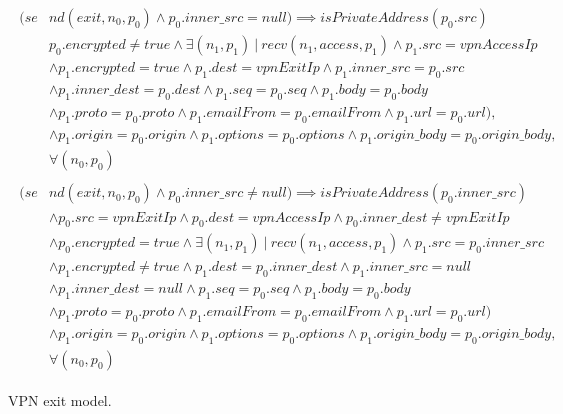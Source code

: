 \begin{figure}[h]
	{\footnotesize
		\begin{subequations}
			\begin{align}
			\begin{split}
			\label{exit_constr1}
			(se& nd(exit, n_{0}, p_{0}) \wedge p_{0}.inner\_src = null) \implies isPrivateAddress(p_{0}.src) \\
			&  p_{0}.encrypted \neq true \wedge \exists (n_{1}, p_{1}) \: | \: recv(n_{1}, access, p_{1}) \wedge p_{1}.src = vpnAccessIp \\
			& \wedge p_{1}.encrypted = true \wedge p_{1}.dest = vpnExitIp \wedge p_{1}.inner\_src = p_{0}.src \\
			& \wedge p_{1}.inner\_dest = p_{0}.dest \wedge p_{1}.seq = p_{0}.seq \wedge p_{1}.body = p_{0}.body \\
			& \wedge p_{1}.proto = p_{0}.proto \wedge p_{1}.emailFrom = p_{0}.emailFrom \wedge p_{1}.url = p_{0}.url), \\
			& \wedge p_{1}.origin = p_{0}.origin   \wedge p_{1}.options = p_{0}.options \wedge p_{1}.origin\_body = p_{0}.origin\_body , \\
			& \forall (n_{0}, p_{0})
			\end{split} \\
			\begin{split}
			\label{exit_constr2}
			(se& nd(exit, n_{0}, p_{0}) \wedge p_{0}.inner\_src \neq null) \implies isPrivateAddress(p_{0}.inner\_src) \\
			& \wedge p_{0}.src = vpnExitIp \wedge p_{0}.dest = vpnAccessIp \wedge p_{0}.inner\_dest \neq vpnExitIp \\
			& \wedge p_{0}.encrypted = true \wedge \exists (n_{1}, p_{1}) \: | \: recv(n_{1}, access, p_{1}) \wedge p_{1}.src = p_{0}.inner\_src \\
			& \wedge p_{1}.encrypted \neq true \wedge p_{1}.dest =  p_{0}.inner\_dest \wedge p_{1}.inner\_src = null \\
			& \wedge p_{1}.inner\_dest = null \wedge p_{1}.seq = p_{0}.seq \wedge p_{1}.body = p_{0}.body \\
			& \wedge p_{1}.proto = p_{0}.proto \wedge p_{1}.emailFrom = p_{0}.emailFrom \wedge p_{1}.url = p_{0}.url) \\
			& \wedge p_{1}.origin = p_{0}.origin   \wedge p_{1}.options = p_{0}.options \wedge p_{1}.origin\_body = p_{0}.origin\_body , \\
			& \forall (n_{0}, p_{0})
			\end{split}
			\end{align}
		\end{subequations}
	}%
	\caption{VPN exit model.}
	\label{vpn_exit}
\end{figure}